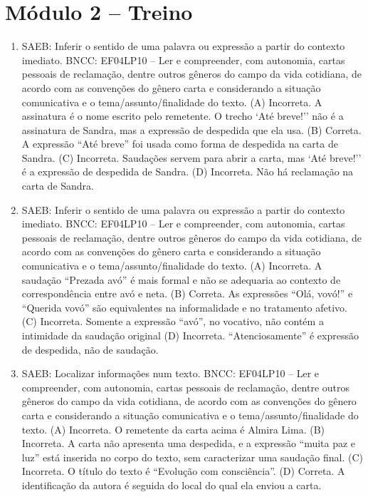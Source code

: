 \section*{Módulo 2 – Treino}

\begin{enumerate}
\item
SAEB: Inferir o sentido de uma palavra ou expressão a partir do
contexto imediato.
BNCC: EF04LP10 -- Ler e compreender, com autonomia, cartas pessoais de
reclamação, dentre outros gêneros do campo da vida cotidiana, de acordo
com as convenções do gênero carta e considerando a situação comunicativa
e o tema/assunto/finalidade do texto.
(A) Incorreta. A assinatura é o nome escrito pelo remetente. O trecho `Até 
breve!'' não é a assinatura de Sandra, mas a expressão de despedida que 
ela usa.
(B) Correta. A expressão ``Até breve'' foi usada como forma de despedida 
na carta de Sandra.
(C) Incorreta. Saudações servem para abrir a carta, mas `Até breve!'' é a 
expressão de despedida de Sandra.   
(D) Incorreta. Não há reclamação na carta de Sandra.

\item
SAEB: Inferir o sentido de uma palavra ou expressão a partir do
contexto imediato.
BNCC: EF04LP10 -- Ler e compreender, com autonomia, cartas pessoais
de reclamação, dentre outros gêneros do campo da vida cotidiana, de
acordo com as convenções do gênero carta e considerando a situação
comunicativa e o tema/assunto/finalidade do texto.
(A) Incorreta. A saudação ``Prezada avó'' é mais formal e não se adequaria
ao contexto de correspondência entre avó e neta.
(B) Correta. As expressões ``Olá, vovó!'' e ``Querida vovó'' são 
equivalentes na informalidade e no tratamento afetivo. 
(C) Incorreta. Somente a expressão ``avó'', no vocativo, não contém
a intimidade da saudação original
(D) Incorreta. ``Atenciosamente'' é expressão de despedida, não de saudação.

\item
SAEB: Localizar informações num texto.
BNCC: EF04LP10 -- Ler e compreender, com autonomia, cartas pessoais de
reclamação, dentre outros gêneros do campo da vida cotidiana, de acordo
com as convenções do gênero carta e considerando a situação comunicativa
e o tema/assunto/finalidade do texto.
(A) Incorreta. O remetente da carta acima é Almira Lima.
(B)  Incorreta. A carta não apresenta uma despedida, e a expressão ``muita 
paz e luz'' está inserida no corpo do texto, sem caracterizar uma 
saudação final. 
(C) Incorreta. O título do texto é ``Evolução com consciência''.
(D) Correta. A identificação da autora é seguida do local do qual ela
enviou a carta.
\end{enumerate}

